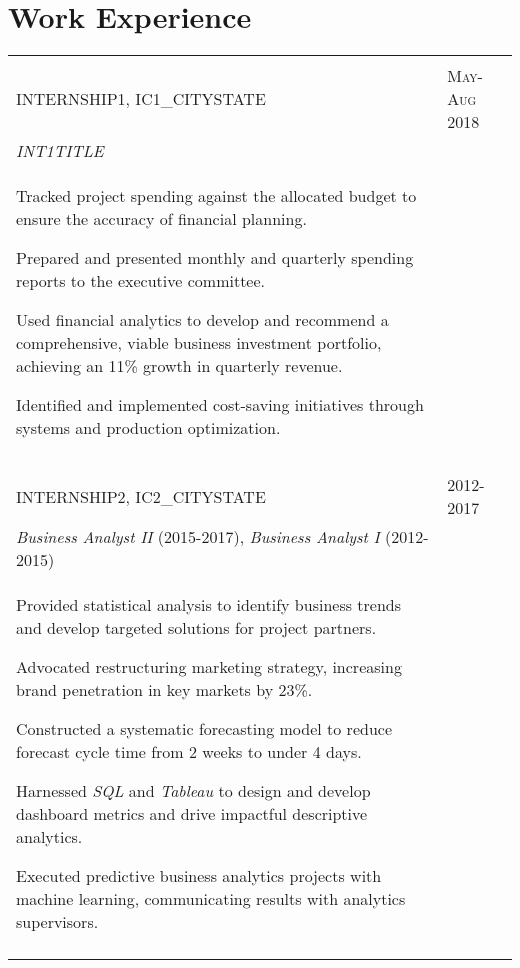\documentclass[a4paper,10pt]{article}
\begin{document}
\section{Work Experience}
\begin{supertabular}{p{13.9cm}>{\raggedleft\arraybackslash}p{3.4cm}}

   \\

	\textsc{INTERNSHIP1}, IC1_CITYSTATE
	& \textsc{May-Aug 2018} \\
	\small	\emph{INT1TITLE} & \\
	\begin{enumerate*}[label =$\circ$, itemjoin={\newline}]
		\item \footnotesize Tracked project spending against the allocated budget to ensure the accuracy of financial planning.
		\item \footnotesize Prepared and presented monthly and quarterly spending reports to the executive committee.
		\item \footnotesize Used financial analytics to develop and recommend a comprehensive, viable business investment portfolio, achieving an 11\% growth in quarterly revenue.
		\item \footnotesize Identified and implemented cost-saving initiatives through systems and production optimization.
	\end{enumerate*} & \\
	 \\
   \\

	\textsc{INTERNSHIP2}, IC2_CITYSTATE
	& \textsc{2012-2017} \\
	\small	\emph{Business Analyst II} (2015-2017), \emph{Business Analyst I} (2012-2015) & \\
	\begin{enumerate*}[label =$\circ$, itemjoin={\newline}]
		\item \footnotesize Provided statistical analysis to identify business trends and develop targeted solutions for project partners.
		\item \footnotesize	Advocated restructuring marketing strategy, increasing brand penetration in key markets by 23\%.
		\item \footnotesize Constructed a systematic forecasting model to reduce forecast cycle time from 2 weeks to under 4 days.
		\item \footnotesize Harnessed \emph{SQL} and \emph{Tableau} to design and develop dashboard metrics and drive impactful descriptive analytics.
		\item \footnotesize Executed predictive business analytics projects with machine learning, communicating results with analytics supervisors.
	\end{enumerate*} & \\
	 \\


\end{supertabular}
\end{document}
